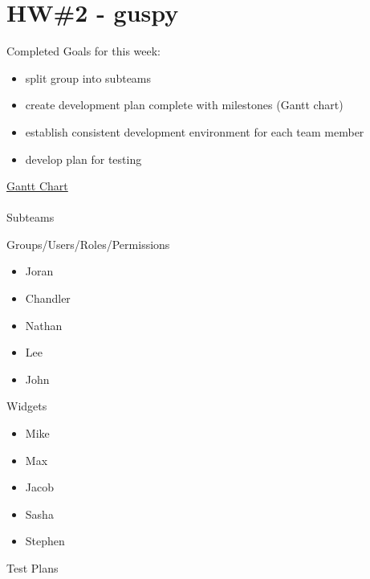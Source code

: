 \documentclass[12pt]{article}
\begin{document}
\section *  {HW\#2 - guspy} 
Completed Goals for this week:
	\begin {itemize}
\item split group into subteams
\item create development plan complete with milestones (Gantt chart)
\item establish consistent development environment for each team member
\item develop plan for testing
\end{itemize}
\href{ganttchart.html}{Gantt Chart}
\\
\\
Subteams 
	\begin{description}
\item Groups/Users/Roles/Permissions
		\begin{itemize}
\item Joran
\item Chandler
\item Nathan
\item Lee
\item John
		\end{itemize}
\item Widgets
		\begin{itemize}
\item Mike
\item Max
\item Jacob
\item Sasha
\item Stephen
		\end{itemize}
	\end{description}
%
Test Plans
\end{document}
